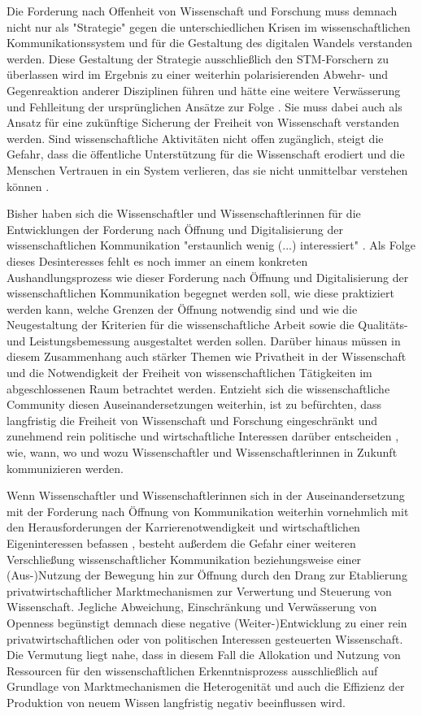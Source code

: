 Die Forderung nach Offenheit von Wissenschaft und Forschung muss demnach nicht nur als "Strategie" gegen die unterschiedlichen Krisen im wissenschaftlichen Kommunikationssystem und für die Gestaltung des digitalen Wandels verstanden werden. Diese Gestaltung der Strategie ausschließlich den STM-Forschern zu überlassen wird im Ergebnis zu einer weiterhin polarisierenden Abwehr- und Gegenreaktion anderer Disziplinen führen und hätte eine weitere Verwässerung und Fehlleitung der ursprünglichen Ansätze zur Folge \cite{Naeder_2010}. Sie muss dabei auch als Ansatz für eine zukünftige Sicherung der Freiheit von Wissenschaft verstanden werden. Sind wissenschaftliche Aktivitäten nicht offen zugänglich, steigt die Gefahr, dass die öffentliche Unterstützung für die Wissenschaft erodiert und die Menschen Vertrauen in ein System verlieren, das sie nicht unmittelbar verstehen können \cite{Resnik_2005}.

Bisher haben sich die Wissenschaftler und Wissenschaftlerinnen für die Entwicklungen der Forderung nach Öffnung und Digitalisierung der wissenschaftlichen Kommunikation "erstaunlich wenig (...) interessiert" \cite[:67]{Hagner_2015}. Als Folge dieses Desinteresses fehlt es noch immer an einem konkreten Aushandlungsprozess wie dieser Forderung nach Öffnung und Digitalisierung der wissenschaftlichen Kommunikation begegnet werden soll, wie diese praktiziert werden kann, welche Grenzen der Öffnung notwendig sind und wie die Neugestaltung der Kriterien für die wissenschaftliche Arbeit sowie die Qualitäts- und Leistungsbemessung ausgestaltet werden sollen. Darüber hinaus müssen in diesem Zusammenhang auch stärker Themen wie Privatheit in der Wissenschaft und die Notwendigkeit der Freiheit von wissenschaftlichen Tätigkeiten im abgeschlossenen Raum betrachtet werden. Entzieht sich die wissenschaftliche Community diesen Auseinandersetzungen weiterhin, ist zu befürchten, dass langfristig die Freiheit von Wissenschaft und Forschung eingeschränkt und zunehmend rein politische und wirtschaftliche Interessen darüber entscheiden \cite{Warnke_2012}, wie, wann, wo und wozu Wissenschaftler und Wissenschaftlerinnen in Zukunft kommunizieren werden.

Wenn Wissenschaftler und Wissenschaftlerinnen sich in der Auseinandersetzung mit der Forderung nach Öffnung von Kommunikation weiterhin vornehmlich mit den Herausforderungen der Karrierenotwendigkeit und wirtschaftlichen Eigeninteressen befassen \cite{Resnik_2005}, besteht außerdem die Gefahr einer weiteren Verschließung wissenschaftlicher Kommunikation beziehungsweise einer (Aus-)Nutzung der Bewegung hin zur Öffnung durch den Drang zur Etablierung privatwirtschaftlicher Marktmechanismen zur Verwertung und Steuerung von Wissenschaft. Jegliche Abweichung, Einschränkung und Verwässerung von Openness begünstigt demnach diese negative (Weiter-)Entwicklung zu einer rein privatwirtschaftlichen oder von politischen Interessen gesteuerten Wissenschaft. Die Vermutung liegt nahe, dass in diesem Fall die Allokation und Nutzung von Ressourcen für den wissenschaftlichen Erkenntnisprozess ausschließlich auf Grundlage von Marktmechanismen die Heterogenität und auch die Effizienz der Produktion von neuem Wissen langfristig negativ beeinflussen wird.

